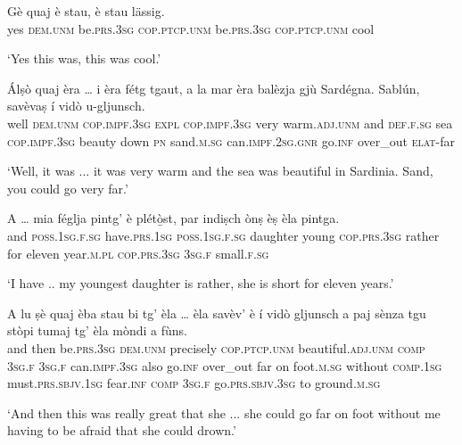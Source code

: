\begin{linenumbers}
	\gll Gè quaj è stau, è stau lässig.\footnotemark{}   \\
	yes \textsc{dem.unm} be.\textsc{prs.3sg} \textsc{cop.ptcp.unm} be.\textsc{prs.3sg} \textsc{cop.ptcp.unm} cool\\
\end{linenumbers}
\medskip
\glt `Yes this was, this was cool.'
\medskip

\begin{linenumbers}
	\gll  Álṣò quaj èra … i èra fétg tgaut, a la mar èra balèzja gjù Sardégna. Sablún, savèvaṣ í vidò u-gljunsch.  \\
	well \textsc{dem.unm} \textsc{cop.impf.3sg} {} \textsc{expl} \textsc{cop.impf.3sg} very warm.\textsc{adj.unm} and \textsc{def.f.sg} sea \textsc{cop.impf.3sg} beauty down \textsc{pn} sand.\textsc{m.sg} can.\textsc{impf.2sg.gnr} go.\textsc{inf} over\_out \textsc{elat}-far\\
\end{linenumbers}
\medskip
\glt `Well, it was ... it was very warm and the sea was beautiful in Sardinia. Sand, you could go very far.'
\medskip

\begin{linenumbers}
	\gll  A … mia féglja pintg’ è plétò̱st, par indiṣch ònṣ èṣ èla\footnotemark{} pintga.   \\
and {}	\textsc{poss.1sg.f.sg} have.\textsc{prs.1sg} {} \textsc{poss.1sg.f.sg} daughter young \textsc{cop.prs.3sg} rather for eleven year.\textsc{m.pl} \textsc{cop.prs.3sg} \textsc{3sg.f} small.\textsc{f.sg}\\
\end{linenumbers}
\medskip
\glt `I have .. my youngest daughter is rather, she is short for eleven years.'
\medskip

\begin{linenumbers}
	\gll  A lu ṣè quaj èba stau bi tg’ èla … èla savèv’ è í vidò gljunsch a paj sènza tgu stòpi tumaj tg' èla mòndi a fùns. \\
	and then be.\textsc{prs.3sg} \textsc{dem.unm} precisely \textsc{cop.ptcp.unm} beautiful.\textsc{adj.unm} \textsc{comp} \textsc{3sg.f} {} \textsc{3sg.f} can.\textsc{impf.3sg} also go.\textsc{inf} over\_out far on foot.\textsc{m.sg} without \textsc{comp.1sg} must.\textsc{prs.sbjv.1sg} fear.\textsc{inf} \textsc{comp} \textsc{3sg.f} go.\textsc{prs.sbjv.3sg} to ground.\textsc{m.sg}\\
\end{linenumbers}
\medskip
\glt `And then this was really great that she ... she could go far on foot without me having to be  afraid that she could drown.'
\medskip

